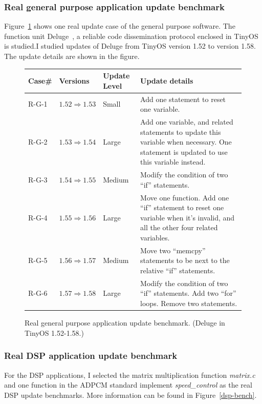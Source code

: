 \subsubsection{Real general purpose application update benchmark}
Figure~\ref{fdeluge.src} shows one real update case of the general purpose
software.
The function unit Deluge~\cite{deluge}, a reliable code dissemination protocol
enclosed in TinyOS is studied.I studied updates of Deluge from TinyOS version 1.52 
to version 1.58. The update details are shown in the figure.

\begin{figure}[htbp]
\begin{center}
\begin{small}
\begin{tabular}{||p{0.5in}|p{1in}|p{0.6in}|p{3.5in}||} \hline

Case\# & Versions & Update Level & Update details \\ \hline \hline

R-G-1 &  ${1.52 \Rightarrow 1.53}$ & Small & Add one statement to reset one variable. \\ \hline
R-G-2 &  ${1.53 \Rightarrow 1.54}$ & Large & Add one variable, and related statements to
	update this variable when necessary. One statement is updated to use this variable instead. \\ \hline
R-G-3 &  ${1.54 \Rightarrow 1.55}$ & Medium & Modify the condition of two ``if'' statements. \\ \hline
R-G-4 &  ${1.55 \Rightarrow 1.56}$ & Large & Move one function. Add one ``if'' statement to reset 
	one variable when it's invalid, and all the other four related variables. \\ \hline
R-G-5 &  ${1.56 \Rightarrow 1.57}$ & Medium & Move two ``memcpy'' statements to be next to the relative ``if'' statements. \\ \hline
R-G-6 &  ${1.57 \Rightarrow 1.58}$ & Large & Modify the condition of two ``if'' statements. Add two ``for'' loops. Remove two statements. \\ \hline

\end{tabular}
\end{small}
\end{center}
\caption{Real general purpose application update benchmark. (Deluge in TinyOS 1.52-1.58.)}
\label{fdeluge.src}
\end{figure}

\subsubsection{Real DSP application update benchmark}
For the DSP applications, I selected the matrix multiplication function {\it matrix.c} and one function in the ADPCM standard implement {\it speed\_control} as the real DSP update benchmarks. More information can be found in Figure~\ref{dsp-bench}. 

